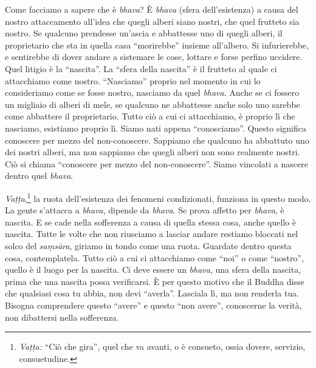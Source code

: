 Come facciamo a sapere che è \emph{bhava}? È \emph{bhava} (sfera
dell'esistenza) a causa del nostro attaccamento all'idea che quegli
alberi siano nostri, che quel frutteto sia nostro. Se qualcuno prendesse
un'ascia e abbattesse uno di quegli alberi, il proprietario che sta in
quella casa ``morirebbe'' insieme all'albero. Si infurierebbe, e
sentirebbe di dover andare a sistemare le cose, lottare e forse perfino
uccidere. Quel litigio è la ``nascita''. La ``sfera della nascita'' è il
frutteto al quale ci attacchiamo come nostro. ``Nasciamo'' proprio nel
momento in cui lo consideriamo come se fosse nostro, nasciamo da quel
\emph{bhava}. Anche se ci fossero un migliaio di alberi di mele, se
qualcuno ne abbattesse anche solo uno sarebbe come abbattere il
proprietario. Tutto ciò a cui ci attacchiamo, è proprio lì che nasciamo,
esistiamo proprio lì. Siamo nati appena ``conosciamo''. Questo significa
conoscere per mezzo del non-conoscere. Sappiamo che qualcuno ha
abbattuto uno dei nostri alberi, ma non sappiamo che quegli alberi non
sono realmente nostri. Ciò si chiama ``conoscere per mezzo del
non-conoscere''. Siamo vincolati a nascere dentro quel \emph{bhava}.

\emph{Vaṭṭa},\footnote{\emph{Vaṭṭa:} ``Ciò che gira'', quel che va avanti, o è consueto,
  ossia dovere, servizio, consuetudine.}
la ruota dell'esistenza dei fenomeni condizionati,
funziona in questo modo. La gente s'attacca a \emph{bhava}, dipende da
\emph{bhava}. Se prova affetto per \emph{bhava}, è nascita. E se cade
nella sofferenza a causa di quella stessa cosa, anche quello è nascita.
Tutte le volte che non riusciamo a lasciar andare restiamo bloccati nel
solco del \emph{saṃsāra}, giriamo in tondo come una ruota. Guardate
dentro questa cosa, contemplatela. Tutto ciò a cui ci attacchiamo come
``noi'' o come ``nostro'', quello è il luogo per la nascita. Ci deve
essere un \emph{bhava}, una sfera della nascita, prima che una nascita
possa verificarsi. È per questo motivo che il Buddha disse che qualsiasi
cosa tu abbia, non devi ``averla''. Lasciala lì, ma non renderla tua.
Bisogna comprendere questo ``avere'' e questo ``non avere'', conoscerne
la verità, non dibattersi nella sofferenza.

